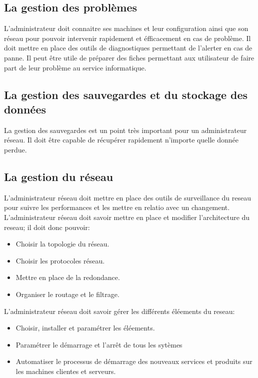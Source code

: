  \subsection{La gestion des problèmes}
 L'administrateur doit connaitre ses machines et leur configuration ainsi que son réseau pour pouvoir intervenir rapidement et éfficacement en cas de problème.
 Il doit mettre en place des outils de diagnostiques permettant de l'alerter en cas de panne.
 Il peut être utile de préparer des fiches permettant aux utilisateur de faire part de leur problème au service informatique.

 \subsection{La gestion des sauvegardes et du stockage des données}
 La gestion des sauvegardes est un point très important pour un administrateur réseau. Il doit être capable de récupérer rapidement n'importe quelle donnée perdue.

 \subsection{La gestion du réseau}
 L'administrateur réseau doit mettre en place des outils de surveillance du reseau pour suivre les performances et les mettre en relatio avec un changement.\\
 L'administrateur réseau doit savoir mettre en place et modifier l'architecture du reseau; il doit donc pouvoir:
 \begin{itemize}
	 \item Choisir la topologie du réseau.
	 \item Choisir les protocoles réseau.
	 \item Mettre en place de la redondance.
	 \item Organiser le routage et le filtrage.
 \end{itemize}
 L'administrateur réseau doit savoir gérer les différents éléements du reseau:
 \begin{itemize}
	 \item Choisir, installer et paramétrer les éléements.
	 \item Paramétrer le démarrage et l'arrêt de tous les sytèmes
	 \item Automatiser le processus de démarrage des nouveaux services et produits sur les machines clientes et serveurs.
 \end{itemize}

